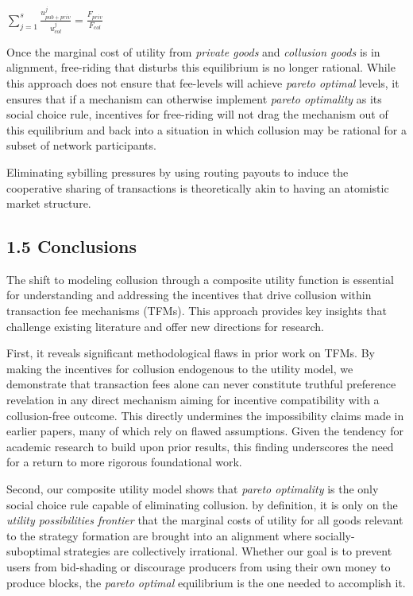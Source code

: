 \documentclass[oneside]{article}   	%
\begin{document}
\LARGE
\begin{adjustwidth}{1.5em}{1.5em}
\begin{math}
\sum_{j=1}^{s} \frac{u_{{pub}+{priv}}^j}{u_{col}^j} = \frac{F_{{priv}}}{F_{col}}
\end{math}
\end{adjustwidth}
\normalsize

Once the marginal cost of utility from \textit{private goods} and \textit{collusion goods} is in alignment, free-riding that disturbs this equilibrium is no longer rational. While this approach does not ensure that fee-levels will achieve \textit{pareto optimal} levels, it ensures that if a mechanism can otherwise implement \textit{pareto optimality} as its social choice rule, incentives for free-riding will not drag the mechanism out of this equilibrium and back into a situation in which collusion may be rational for a subset of network participants.

Eliminating sybilling pressures by using routing payouts to induce the cooperative sharing of transactions is theoretically akin to having an atomistic market structure.

\subsection*{1.5 Conclusions}

The shift to modeling collusion through a composite utility function is essential for understanding and addressing the incentives that drive collusion within transaction fee mechanisms (TFMs). This approach provides key insights that challenge existing literature and offer new directions for research.

First, it reveals significant methodological flaws in prior work on TFMs. By making the incentives for collusion endogenous to the utility model, we demonstrate that transaction fees alone can never constitute truthful preference revelation in any direct mechanism aiming for incentive compatibility with a collusion-free outcome. This directly undermines the impossibility claims made in earlier papers, many of which rely on flawed assumptions. Given the tendency for academic research to build upon prior results, this finding underscores the need for a return to more rigorous foundational work.

Second, our composite utility model shows that \textit{pareto optimality} is the only social choice rule capable of eliminating collusion. by definition, it is only on the \textit{utility possibilities frontier} that the marginal costs of utility for all goods relevant to the strategy formation are brought into an alignment where socially-suboptimal strategies are collectively irrational. Whether our goal is to prevent users from bid-shading or discourage producers from using their own money to produce blocks, the \textit{pareto optimal} equilibrium is the one needed to accomplish it. 
\end{document}

